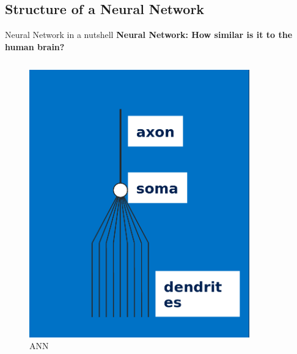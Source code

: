 \documentclass[10pt]{beamer}
\begin{document}
	\subsection{Structure of a Neural Network}
	\begin{frame}[t]{Neural Network in a nutshell}
		\large{\textbf{Neural Network: How similar is it to the human brain?}}
		\begin{columns}
			\begin{column}{0.5\textwidth}
				\begin{center}
					\begin{figure}
						\includegraphics[width=0.9\linewidth]{images/didl1}
						\caption{ANN}
					\end{figure}
				\end{center}
			\end{column}
			\begin{column}{0.5\textwidth}
				\begin{center}
					\begin{figure}

\end{figure}
\end{center}
\end{column}
\end{columns}
\end{frame}
\end{document}
